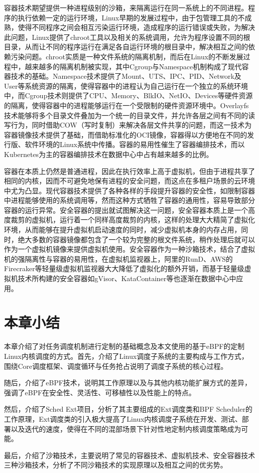 容器技术期望提供一种进程级别的沙箱，来隔离运行在同一系统上的不同进程。程序的执行依赖一定的运行环境，Linux早期的发展过程中，由于包管理工具的不成熟，使得不同程序之间会相互污染运行环境，造成程序的运行错误或失败，为解决此问题，Linux提供了chroot工具以及相关的系统调用，允许为程序设置不同的根目录，从而让不同的程序运行在满足各自运行环境的根目录中，解决相互之间的依赖污染问题。chroot实质是一种文件系统的隔离机制，而后在Linux的不断发展过程中，越来越多的隔离机制被实现，其中Cgroup与Namespace机制构成了现代容器技术的基础。Namespace技术提供了Mount、UTS、IPC、PID、Network及User等系统资源的隔离，使得容器中的进程认为自己运行在一个独立的系统环境中，而Cgroup技术则提供了CPU、Memory、BlkIO、NetIO、Devices等硬件资源的隔离，使得容器中的进程能够运行在一个受限制的硬件资源环境中。Overlayfs技术能够将多个目录文件叠加为一个统一的目录文件，并允许各层之间有不同的读写行为，同时借助COW（写时复制）来解决各层文件共享的问题，而这一技术为容器镜像技术提供了基础，而借助标准化的OCI镜像，容器得以方便地在不同的发行版、软件环境的Linux系统中传播。容器的易用性催生了容器编排技术，而以Kubernetes为主的容器编排技术在数据中心中占有越来越多的比例。

容器在本质上仍然是普通进程，因此在执行效率上高于虚拟机，但由于进程共享了相同的内核，因而不可避免地保有进程的安全问题，而这点在多租户场景的云环境中尤为凸显。现代容器技术提供了各种各样的手段提升容器的安全性，如限制容器中进程能够使用的系统调用等，然而这种方式牺牲了容器的通用性，容易导致部分容器的运行异常。安全容器的提出就试图解决这一问题，安全容器本质上是一个高度裁剪的虚拟机，运行着一个同样高度裁剪的内核，这样的处理大大精简了虚拟化环境，从而能够在提升虚拟机启动速度的同时，减少虚拟机本身的内存占用，同时，绝大多数的容器镜像都包含了一个较为完整的根文件系统，稍作处理后就可以作为一个虚拟机镜像来提供虚拟机使用。安全容器作为一种沙箱技术，结合了虚拟机的强隔离性与容器的易用性，在虚拟机监视器上，阿里的RunD\citep{li2022rund}、AWS的Firecraker\citep{agache2020firecracker}等轻量级虚拟机监视器大大降低了虚拟化的额外开销，而基于轻量级虚拟机技术所构建的安全容器如gVisor、KataContainer\citep{randazzo2019kata}等也逐渐在数据中心中应用。

\section{本章小结}

本章介绍了对任务调度机制进行定制的基础概念及本文使用的基于eBPF的定制Linux内核调度的方式。首先，介绍了Linux调度子系统的主要构成与工作方式，围绕Core调度框架、调度循环与任务抢占说明了调度子系统的核心过程。

随后，介绍了eBPF技术，说明其工作原理以及与其他内核功能扩展方式的差异，强调了eBPF在安全性、灵活性、可移植性以及性能上的特点。

然后，介绍了Sched Ext项目，分析了其主要组成的Ext调度类和BPF Scheduler的工作原理，Ext调度类的引入极大提高了Linux内核调度子系统在开发、测试、部署以及迭代的速度，使得在不同的混部场景下针对性地定制内核调度策略成为可能。

最后，介绍了沙箱技术，主要说明了常见的容器技术、虚拟机技术、安全容器技术三种沙箱技术，分析了不同沙箱技术的实现原理以及相互之间的优劣势。